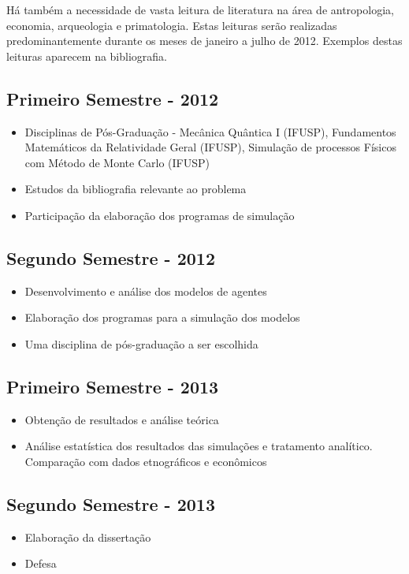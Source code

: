 \documentclass[12pt]{article}
\begin{document}
Há também a necessidade de vasta leitura de literatura na área de antropologia, economia, arqueologia e primatologia. Estas leituras serão realizadas predominantemente durante os meses de janeiro a julho de 2012. Exemplos destas leituras aparecem na bibliografia.

\subsection{Primeiro Semestre - 2012}
\begin{itemize}
\item Disciplinas de Pós-Graduação - Mecânica Quântica I (IFUSP),
Fundamentos Matemáticos da Relatividade Geral (IFUSP), Simulação de processos Físicos com Método de Monte Carlo (IFUSP)
\item Estudos da bibliografia relevante ao problema
\item Participação da elaboração dos programas de simulação
\end{itemize}

\subsection{Segundo Semestre - 2012}
\begin{itemize}
\item Desenvolvimento e análise dos modelos de agentes
\item Elaboração dos programas para a simulação dos modelos
\item Uma disciplina de pós-graduação a ser escolhida
\end{itemize}


\subsection{Primeiro Semestre - 2013}
\begin{itemize}
\item Obtenção de resultados e análise teórica
\item Análise estatística dos resultados das simulações e tratamento analítico.
Comparação com dados etnográficos e econômicos
\end{itemize}


\subsection{Segundo Semestre - 2013}
\begin{itemize}
\item Elaboração da dissertação
\item Defesa
\end{itemize}
\end{document}
